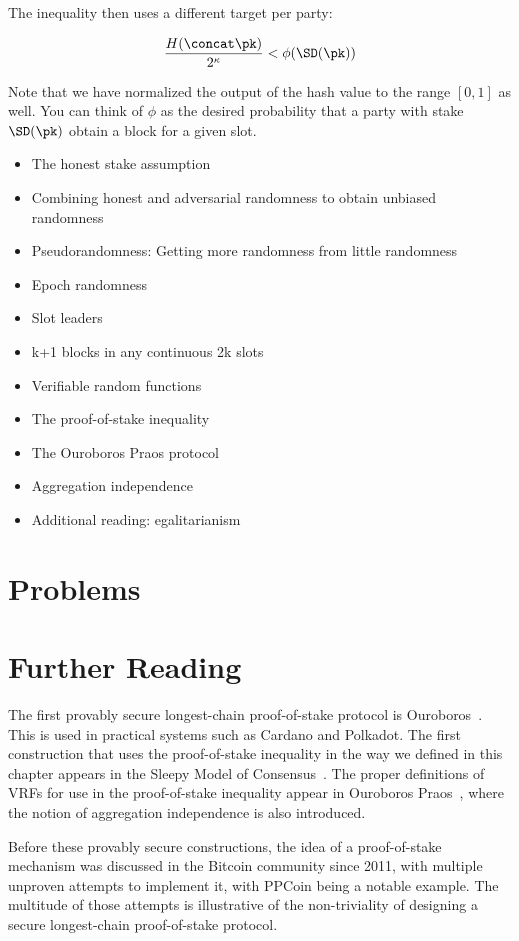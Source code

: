 The inequality then uses a different target per party:

\[
  \frac{H(\sl \concat \pk)}{2^\kappa} < \phi(\SD(\pk))
\]

Note that we have normalized the output of the hash value to the range $[0, 1]$ as well.
You can think of $\phi$ as the desired probability that a party with stake $\SD(\pk)$
obtain a block for a given slot.





{\color{red}
\begin{itemize}
\item The honest stake assumption
\item Combining honest and adversarial randomness to obtain unbiased randomness
\item Pseudorandomness: Getting more randomness from little randomness
\item Epoch randomness
\item Slot leaders
\item k+1 blocks in any continuous 2k slots
\item Verifiable random functions
\item The proof-of-stake inequality
\item The Ouroboros Praos protocol
\item Aggregation independence
\item Additional reading: egalitarianism
\end{itemize}
}

\section*{Problems}

\section*{Further Reading}

The first provably secure longest-chain proof-of-stake protocol is Ouroboros~\cite{ouroboros}.
This is used in practical systems such as Cardano and Polkadot. The first
construction that uses the proof-of-stake inequality in the way we defined in this chapter
appears in the Sleepy Model of Consensus~\cite{sleepy-model}. The proper definitions of
VRFs for use in the proof-of-stake inequality appear in Ouroboros Praos~\cite{praos},
where the notion of aggregation independence is also introduced.

Before these provably secure constructions, the idea of a proof-of-stake mechanism was
discussed in the Bitcoin community since 2011, with multiple unproven attempts to implement it,
with PPCoin being a notable example. The multitude of those attempts is illustrative of the
non-triviality of designing a secure longest-chain proof-of-stake protocol.